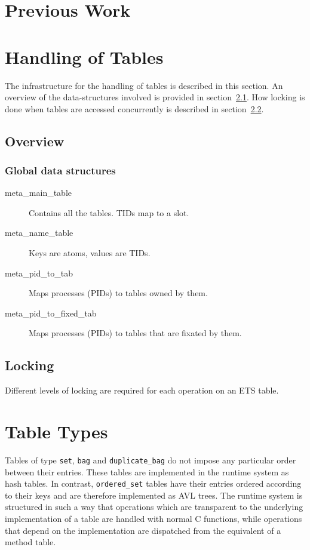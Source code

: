 \documentclass[aps,pre,preprint,nofootinbib]{revtex4}
\begin{document}
\section{Previous Work}



\section{Handling of Tables}

The infrastructure for the handling of tables is described in this section. 
An overview of the data-structures involved is provided in section~\ref{sec:tables_overview}.
How locking is done when tables are accessed concurrently is described in section~\ref{sec:tables_locking}.

\subsection{Overview} \label{sec:tables_overview}

\subsubsection{Global data structures}

\begin{description}
  \item[meta\_main\_table] Contains all the tables. TIDs map to a slot.
  \item[meta\_name\_table] Keys are atoms, values are TIDs.
  \item[meta\_pid\_to\_tab] Maps processes (PIDs) to tables owned by them.
  \item[meta\_pid\_to\_fixed\_tab] Maps processes (PIDs) to tables that are
    fixated by them.
\end{description}

\subsection{Locking} \label{sec:tables_locking}

Different levels of locking are required for each operation on an ETS table.

\section{Table Types} \label{sec:table_types}

Tables of type \verb|set|, \verb|bag| and \verb|duplicate_bag| do not impose any particular order between their entries. These tables are implemented in the runtime system as hash tables. In contrast, \verb|ordered_set| tables have their entries ordered according to their keys and are therefore implemented as AVL trees. The runtime system is structured in such a way that operations which are transparent to the underlying implementation of a table are handled with normal C functions, while operations that depend on the implementation are dispatched from the equivalent of a method table.
\end{document}
